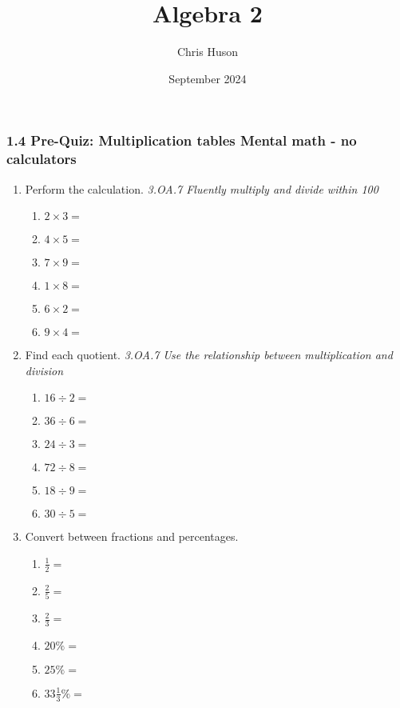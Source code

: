 \documentclass[12pt, twoside]{article}
\title{Algebra 2}
\author{Chris Huson}
\date{September 2024}
\begin{document}
\subsubsection*{1.4 Pre-Quiz: Multiplication tables \hfill Mental math - no calculators}
\begin{enumerate}[itemsep=0.5cm]

\item Perform the calculation. \hfill \emph{3.OA.7 Fluently multiply and divide within 100}
    \begin{multicols}{2}
        \begin{enumerate}[itemsep=0.5cm]
            \item $2 \times 3 =$
            \item $4 \times 5 =$
            \item $7 \times 9 =$
            \item $1 \times 8 =$
            \item $6 \times 2 =$
            \item $9 \times 4 =$
        \end{enumerate}
    \end{multicols}

\item Find each quotient. \hfill \emph{3.OA.7 Use the relationship between multiplication and division}
    \begin{multicols}{2}
        \begin{enumerate}[itemsep=0.5cm]
            \item $16 \div 2 =$
            \item $36 \div 6 =$
            \item $24 \div 3 =$
            \item $72 \div 8 =$
            \item $18 \div 9 =$
            \item $30 \div 5 =$
        \end{enumerate}
    \end{multicols}

\item Convert between fractions and percentages.
\begin{multicols}{2}
\begin{enumerate}[itemsep=0.5cm]
    \item $\frac{1}{2}=$
    \item $\frac{2}{5}=$
    \item $\frac{2}{3}=$
    \item $20\% =$
    \item $25\% =$
    \item $33 \frac{1}{3}\% =$
\end{enumerate}
\end{multicols}


\end{enumerate}
\end{document}

